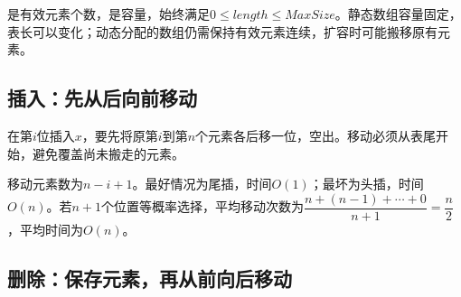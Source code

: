\hypertarget{ds2-sq-struct}{}

\Needspace{96.0pt}

\hypertarget{ds2-capacity}{}

是有效元素个数，是容量，始终满足$0\le length\le MaxSize$。静态数组容量固定，表长可以变化；动态分配的数组仍需保持有效元素连续，扩容时可能搬移原有元素。


\hypertarget{ds2-sq-find}{}

\Needspace{96.0pt}

\hypertarget{ds2-insert}{}

\subsection{插入：先从后向前移动}\label{ds2-insert}

\hypertarget{ds2-insert-idea}{}

在第$i$位插入$x$，要先将原第$i$到第$n$个元素各后移一位，空出。移动必须从表尾开始，避免覆盖尚未搬走的元素。


\hypertarget{ds2-array-figure}{}


\hypertarget{ds2-sq-insert}{}

\Needspace{134.4pt}

\hypertarget{ds2-insert-boundary}{}


\hypertarget{ds2-insert-count}{}

移动元素数为$n-i+1$。最好情况为尾插，时间$O(1)$；最坏为头插，时间$O(n)$。若$n+1$个位置等概率选择，平均移动次数为$\dfrac{n+(n-1)+\cdots+0}{n+1}=\dfrac n2$，平均时间为$O(n)$。


\hypertarget{ds2-delete}{}

\subsection{删除：保存元素，再从前向后移动}\label{ds2-delete}

\hypertarget{ds2-delete-idea}{}

